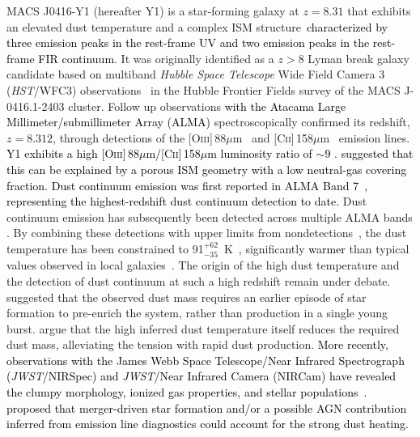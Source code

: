 \documentclass[trackchanges,twocolumn]{aastex701}
\newcommand{\ca}[1]{\textcolor{black}{#1}} %
\newcommand{\cc}[1]{\textcolor{black}{#1}} %
\newcommand{\cd}[1]{\textcolor{black}{#1}} %
\newcommand{\cg}[1]{\textcolor{black}{#1}} %
\newcommand{\cl}[1]{\textcolor{black}{#1}}
\newcommand{\cn}[1]{\textcolor{black}{#1}}
\newcommand{\co}[1]{\textcolor{black}{#1}}
\newcommand{\cp}[1]{\textcolor{black}{#1}}
\begin{document}
MACS J0416-Y1 (hereafter Y1) is a star-forming galaxy at $z = 8.31$ that exhibits an elevated dust temperature and a complex ISM structure~\ca{characterized by three emission peaks in the rest-frame UV and two emission peaks in the rest-frame FIR continuum}. It was originally identified as a $z>8$ Lyman break galaxy candidate based on multiband \textit{Hubble Space Telescope} Wide Field Camera 3 (\textit{HST}/WFC3) observations~\citep{Infante2015, Laporte2015} in the Hubble Frontier Fields \citep[HFF,][]{Lotz2017} survey of the MACS J-0416.1-2403 cluster. Follow up observations \cn{with} \cl{the Atacama Large Millimeter/submillimeter Array (ALMA) }spectroscopically confirmed its redshift, $z=8.312$, through detections of the [\textsc{Oiii}]\,88$\mu$m~\citep{Tamura2019} and [\textsc{Cii}]\,158$\mu$m~\citep{Bakx2020} emission lines. \co{Y1 exhibits a high [\textsc{Oiii}]\,88$\mu$m/[\textsc{Cii}]\,158$\mu$m luminosity ratio of $\sim9$ \citep{Bakx2020}. \citet{Hagimoto2025} suggested that this can be explained by a porous ISM geometry with a low neutral-gas covering fraction.}
\cg{Dust continuum emission was first reported in ALMA Band 7~\citep{Tamura2019}, representing the highest-redshift dust continuum detection to date.} %
Dust continuum emission has subsequently been detected across multiple ALMA bands \citep{Tamura2019,Harshan2024,Bakx2025}. By combining these detections with upper limits from nondetections~\citep{Bakx2020, Jones2024,Bakx2025}, the dust temperature has been constrained to 91$^{+62}_{-35}$~K~\citep{Bakx2025}, significantly \cd{warmer} than typical values observed in local galaxies~\citep[$\sim25$~K; e.g.,][]{Schreiber2018}. The origin of the high dust temperature and the detection of dust continuum at such a high redshift remain under debate. \citet{Tamura2019} suggested that the observed dust mass requires an earlier episode of star formation to pre-enrich the system, rather than production in a single young burst. \citet{Bakx2020} argue that the high inferred dust temperature itself reduces the required dust mass, alleviating the tension with rapid dust production. 
\cc{More recently, observations with \cl{the James Webb Space Telescope/Near Infrared Spectrograph (\textit{JWST}/NIRSpec) and \textit{JWST}/Near Infrared Camera (NIRCam)} have revealed the clumpy morphology, ionized gas properties, and stellar populations~\citep[e.g.,][]{Ma2024,Harshan2024}.} 
\cp{\citet{Harshan2024} proposed that merger-driven star formation and/or a possible AGN contribution inferred from emission line diagnostics could account for the strong dust heating.}
\end{document}

